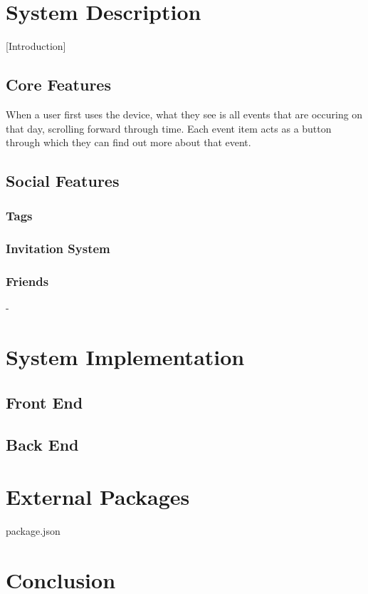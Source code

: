 \documentclass[11pt]{article}
\begin{document}
\section {System Description}

[Introduction]
\subsection {Core Features}

When a user first uses the device, what they see is all events that are occuring on that day, scrolling forward through time. Each event item acts as a button through which they can find out more about that event.



\subsection {Social Features}
\subsubsection{Tags}
\subsubsection{Invitation System}
\subsubsection{Friends}



-



\section {System Implementation}
\subsection {Front End}
\subsection {Back End}

\section {External Packages}

package.json

\section {Conclusion}
\end{document}
